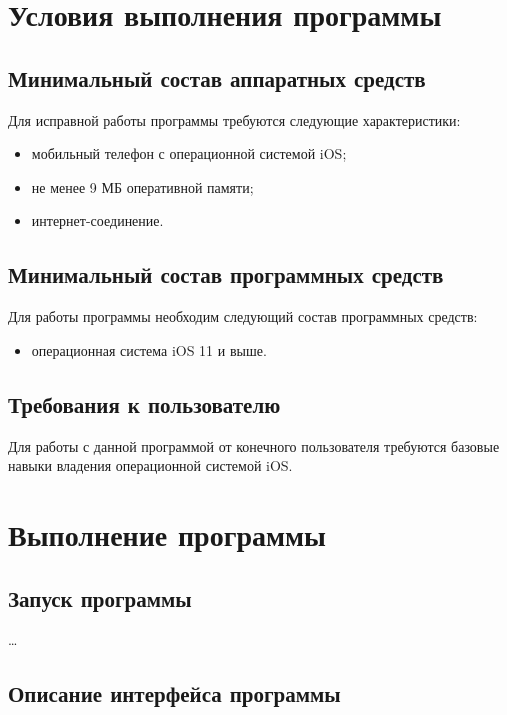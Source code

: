 \documentclass{../includes/TechDoc}
\begin{document}
    \section{Условия выполнения программы}

    \subsection{Минимальный состав аппаратных средств}

    Для исправной работы программы требуются следующие характеристики:
    \begin{itemize}[noitemsep]
        \item мобильный телефон с операционной системой iOS;
        \item не менее 9 МБ оперативной памяти;
        \item интернет-соединение.
    \end{itemize}

    \subsection{Минимальный состав программных средств}

    Для работы программы необходим следующий состав программных средств:
    \begin{itemize}[noitemsep]
        \item операционная система iOS 11 и выше.
    \end{itemize}

    \subsection{Требования к пользователю}

    Для работы с данной программой от конечного пользователя требуются базовые навыки владения
    операционной системой iOS.


    \section{Выполнение программы}

    \subsection{Запуск программы}

    \ldots

    \subsection{Описание интерфейса программы}
\end{document}
